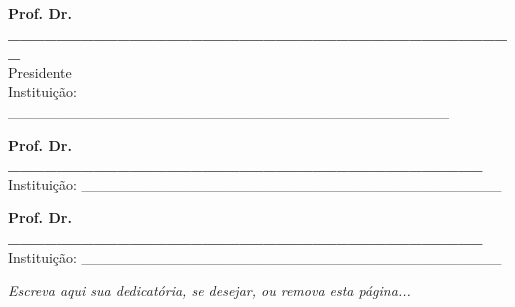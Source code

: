 \documentclass[
	12pt,				%
	oneside,			%
	a4paper,			%
	english,			%
	brazil				%
	]{abntex2ppgsi}
\begin{document}
\begin{folhadeaprovacao}
\begin{center}
%
% 
% 
%
% 
% 
% 
%
%
\textbf{Prof. Dr. \_\_\_\_\_\_\_\_\_\_\_\_\_\_\_\_\_\_\_\_\_\_\_\_\_\_\_\_\_\_\_\_\_\_\_\_\_\_\_\_\_\_} 
\\ Presidente 
\\ Instituição: \_\_\_\_\_\_\_\_\_\_\_\_\_\_\_\_\_\_\_\_\_\_\_\_\_\_\_\_\_\_\_\_\_\_\_\_\_\_\_\_\_\_ 

\vspace*{2cm}

\textbf{Prof. Dr. \_\_\_\_\_\_\_\_\_\_\_\_\_\_\_\_\_\_\_\_\_\_\_\_\_\_\_\_\_\_\_\_\_\_\_\_\_\_\_} 
\\ Instituição: \_\_\_\_\_\_\_\_\_\_\_\_\_\_\_\_\_\_\_\_\_\_\_\_\_\_\_\_\_\_\_\_\_\_\_\_\_\_\_\_

\vspace*{2cm}

\textbf{Prof. Dr. \_\_\_\_\_\_\_\_\_\_\_\_\_\_\_\_\_\_\_\_\_\_\_\_\_\_\_\_\_\_\_\_\_\_\_\_\_\_\_} 
\\ Instituição: \_\_\_\_\_\_\_\_\_\_\_\_\_\_\_\_\_\_\_\_\_\_\_\_\_\_\_\_\_\_\_\_\_\_\_\_\_\_\_\_

\end{center}
  
\end{folhadeaprovacao}

%
% 
\begin{dedicatoria}
   \vspace*{\fill}
   \centering
   \noindent
   \textit{Escreva aqui sua dedicatória, se desejar, ou remova esta página...} 
	 \vspace*{\fill}
\end{dedicatoria}
\end{document}
